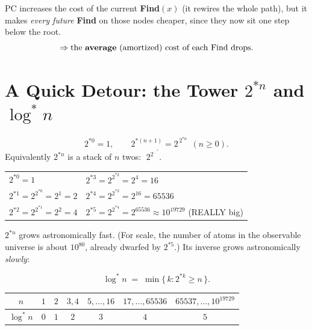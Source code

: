 \documentclass[11pt]{article}
\begin{document}
\begin{keybox}
PC \textcolor{rustW}{increases} the cost of the current \textbf{Find}$(x)$ (it rewires the whole path), but it makes \emph{every future} \textbf{Find} on those nodes cheaper, since they now sit one step below the root.
\[
  \Rightarrow \text{the \textbf{average} (amortized) cost of each Find drops.}
\]
\end{keybox}

\section{A Quick Detour: the Tower $2^{*n}$ and $\log^* n$}

\begin{defbox}[$2^{*n}$ (a tower of 2's)]
\[
  2^{*0} = 1, \qquad 2^{*(n+1)} = 2^{\,2^{*n}} \ \ (n \ge 0).
\]
Equivalently $2^{*n}$ is a stack of $n$ twos: $\;2^{2^{\,\cdot^{\,\cdot^{\,2}}}}$.
\end{defbox}

\begin{center}
\renewcommand{\arraystretch}{1.3}
\begin{tabular}{l l}
$2^{*0}=1$ & $2^{*3}=2^{2^{*2}}=2^4=16$\\
$2^{*1}=2^{2^{*0}}=2^1=2$ & $2^{*4}=2^{2^{*3}}=2^{16}=65536$\\
$2^{*2}=2^{2^{*1}}=2^2=4$ & $2^{*5}=2^{2^{*4}}=2^{65536}\approx 10^{19729}$ \;(REALLY big)\\
\end{tabular}
\end{center}

$2^{*n}$ \textcolor{rustW}{grows astronomically fast}. (For scale, the number of atoms in the observable universe is about $10^{80}$, already dwarfed by $2^{*5}$.) Its inverse grows astronomically \emph{slowly}:

\begin{defbox}
\[
  \log^* n \;=\; \min\{\, k : 2^{*k} \ge n \,\}.
\]
\end{defbox}

\begin{center}
\small\setlength{\tabcolsep}{4.5pt}
\renewcommand{\arraystretch}{1.3}
\begin{tabular}{|c|c|c|c|c|c|c|}
\hline
$n$ & $1$ & $2$ & $3,4$ & $5,\ldots,16$ & $17,\ldots,65536$ & $65537,\ldots,10^{19729}$\\
\hline
$\log^* n$ & $0$ & $1$ & $2$ & $3$ & $4$ & $5$\\
\hline
\end{tabular}
\end{center}
\end{document}
